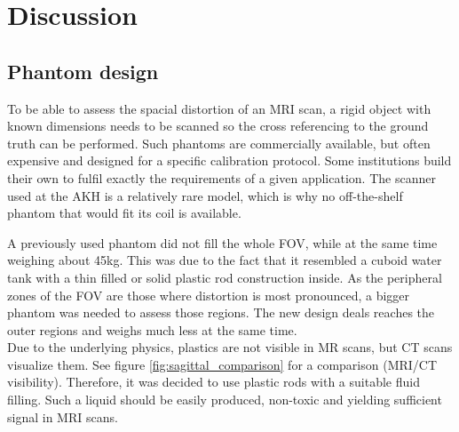 


\chapter{Discussion}

\section{Phantom design}

To be able to assess the spacial distortion of an MRI scan, a rigid object with known dimensions needs to be scanned so the cross referencing to the ground truth can be performed.
Such phantoms are commercially available, but often expensive and designed for a specific calibration protocol.
Some institutions build their own to fulfil exactly the requirements of a given application.
The scanner used at the AKH is a relatively rare model, which is why no off-the-shelf phantom that would fit its coil is available.

A previously used phantom did not fill the whole FOV, while at the same time weighing about 45kg.
This was due to the fact that it resembled a cuboid water tank with a thin filled or solid plastic rod construction inside.
As the peripheral zones of the FOV are those where distortion is most pronounced, a bigger phantom was needed to assess those regions.
The new design deals reaches the outer regions and weighs much less at the same time.\\

Due to the underlying physics, plastics are not visible in MR scans, but CT scans visualize them. 
See figure \ref{fig:sagittal_comparison} for a comparison (MRI/CT visibility).
Therefore, it was decided to use plastic rods with a suitable fluid filling.
Such a liquid should be easily produced, non-toxic and yielding sufficient signal in MRI scans.

